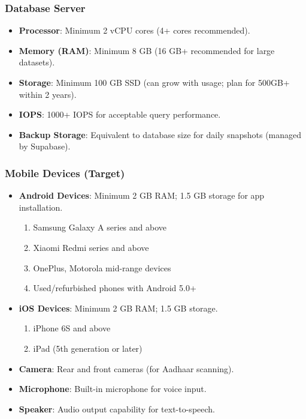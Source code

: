 \subsubsection{Database Server}
\begin{itemize}
    \item \textbf{Processor}: Minimum 2 vCPU cores (4+ cores recommended).
    \item \textbf{Memory (RAM)}: Minimum 8 GB (16 GB+ recommended for large datasets).
    \item \textbf{Storage}: Minimum 100 GB SSD (can grow with usage; plan for 500GB+ within 2 years).
    \item \textbf{IOPS}: 1000+ IOPS for acceptable query performance.
    \item \textbf{Backup Storage}: Equivalent to database size for daily snapshots (managed by Supabase).
\end{itemize}

\subsubsection{Mobile Devices (Target)}
\begin{itemize}
    \item \textbf{Android Devices}: Minimum 2 GB RAM; 1.5 GB storage for app installation.
    \begin{enumerate}
        \item Samsung Galaxy A series and above
        \item Xiaomi Redmi series and above
        \item OnePlus, Motorola mid-range devices
        \item Used/refurbished phones with Android 5.0+
    \end{enumerate}
    \item \textbf{iOS Devices}: Minimum 2 GB RAM; 1.5 GB storage.
    \begin{enumerate}
        \item iPhone 6S and above
        \item iPad (5th generation or later)
    \end{enumerate}
    \item \textbf{Camera}: Rear and front cameras (for Aadhaar scanning).
    \item \textbf{Microphone}: Built-in microphone for voice input.
    \item \textbf{Speaker}: Audio output capability for text-to-speech.
\end{itemize}


